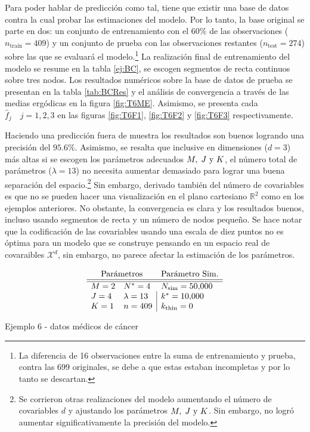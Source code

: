 \documentclass[../Main/Main.tex]{subfiles}
\begin{document}
Para poder hablar de predicción como tal, tiene que existir una base de datos contra la cual probar las estimaciones del modelo. Por lo tanto, la base original se parte en dos: un conjunto de entrenamiento con el $60\%$ de las observaciones ($n_{\text{train}} = 409$) y un conjunto de prueba con las observaciones restantes ($n_{\text{test}} = 274$) sobre las que se evaluará el modelo.\footnote{La diferencia de 16 observaciones entre la suma de entrenamiento y prueba, contra las 699 originales, se debe a que estas estaban incompletas y por lo tanto se descartan.} La realización final de entrenamiento del modelo se resume en la tabla \ref{ej:BC}, se escogen segmentos de recta continuos sobre tres nodos. Los resultados numéricos sobre la base de datos de prueba se presentan en la tabla \ref{tab:BCRes} y el análisis de convergencia a través de las medias ergódicas en la figura \ref{fig:T6ME}. Asimismo, se presenta cada $\hat{f}_j\quad j = 1,2,3$ en las figuras \ref{fig:T6F1}, \ref{fig:T6F2} y \ref{fig:T6F3} respectivamente.

Haciendo una predicción fuera de muestra los resultados son buenos logrando una precisión del $95.6\%$. Asimismo, se resalta que inclusive en dimensiones ($d = 3$) más altas si se escogen los parámetros adecuados $M,\;J\text{ y }K$, el número total de parámetros ($\lambda = 13$) no necesita aumentar demasiado para lograr una buena separación del espacio.\footnote{Se corrieron otras realizaciones del modelo aumentando el número de covariables $d$ y ajustando los parámetros $M,\;J\text{ y }K$. Sin embargo, no logró aumentar significativamente la precisión del modelo.} Sin embargo, derivado también del número de covariables es que no se pueden hacer una visualización en el plano cartesiano $\mathbb{R}^2$ como en los ejemplos anteriores. No obstante, la convergencia es clara y los resultados buenos, incluso usando segmentos de recta y un número de nodos pequeño. Se hace notar que la codificación de las covariables usando una escala de diez puntos no es óptima para un modelo que se construye pensando en un espacio real de covaraibles $\mathcal{X}^d$, sin embargo, no parece afectar la estimación de los parámetros. 

\begin{table}[ht]
$$\paramsmod{2}{4}{1}{4}{13}{409}{\num{50000}}{\num{10000}}{0}$$
\caption{Ejemplo 6 - datos médicos de cáncer}
\label{ej:BC}
\end{table}
\end{document}
